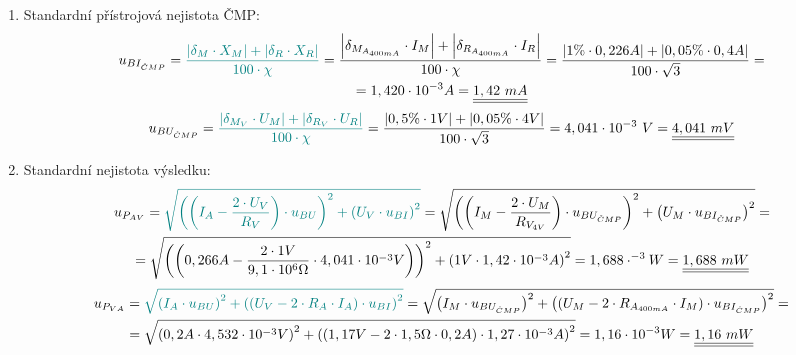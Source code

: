\documentclass[a4paper, czech]{article}
\begin{document}
\begin{enumerate}
    \item Standardní přístrojová nejistota ČMP:
    \begin{multline*}
        u_{BI_{\Check{C}MP}} = \textcolor{teal}{\frac{\left| \delta_M \cdot X_M \right| + \left| \delta_R \cdot X_R \right|}{100 \cdot \chi}} = \frac{\left| \delta_{M_{A_{400mA}}} \cdot I_M \right| + \left| \delta_{R_{A_{400mA}}} \cdot I_R \right|}{100 \cdot \chi} = \frac{\left| 1 \% \cdot 0,226 A \right| + \left| 0,05 \% \cdot 0,4 A \right|}{100 \cdot \sqrt{3}} = \\
        = 1,420 \cdot 10^{-3} A = \underline{\underline{1,42\ mA}}
    \end{multline*}
    \begin{multline*}
        u_{BU_{\Check{C}MP}} = \textcolor{teal}{\frac{\left| \delta_{M_{V}} \cdot U_M \right| + \left| \delta_{R_{V}} \cdot U_R \right|}{100 \cdot \chi}} = \frac{|0,5 \% \cdot 1 V|+|0,05 \% \cdot 4 V|}{100 \cdot \sqrt{3}} = 4,041 \cdot 10^{-3}\ V = \underline{\underline{4,041\ mV}} \hfill
    \end{multline*}

    \item Standardní nejistota výsledku:
    \begin{multline*}
        u_{P_{AV}} = \textcolor{teal}{\sqrt{\left( \left( I_A - \frac{2 \cdot U_V}{R_V} \right) \cdot u_{BU} \right)^2 + \left( U_V \cdot u_{BI} \right)^2}} = \sqrt{\left( \left( I_M - \frac{2 \cdot U_M}{R_{V_{4V}}} \right) \cdot u_{BU_{\Check{C}MP}} \right)^2 + \left( U_M \cdot u_{BI_{\Check{C}MP}} \right)^2} = \\
        = \sqrt{\left( \left( 0,266A - \frac{2 \cdot 1V}{9,1 \cdot 10^6 \Omega} \cdot 4,041 \cdot 10^{-3}V \right) \right)^2 + \left( 1V \cdot 1,42 \cdot 10^{-3}A \right)^2} = 1,688 \cdot^{-3}W = \underline{\underline{1,688\ mW}}
    \end{multline*}
    \begin{multline*}
        u_{P_{VA}} = \textcolor{teal}{\sqrt{\left( I_A \cdot u_{BU} \right)^2 + \left( \left( U_V - 2 \cdot R_A \cdot I_A \right) \cdot u_{BI} \right)^2}} = \sqrt{\left( I_M \cdot u_{BU_{\Check{C}MP}} \right)^2 + \left( \left( U_M - 2 \cdot R_{A_{400mA}} \cdot I_M \right) \cdot u_{BI_{\Check{C}MP}} \right)^2} =  \\
        = \sqrt{\left( 0,2A \cdot 4,532 \cdot 10^{-3}V \right)^2 + \left( \left( 1,17V - 2 \cdot 1,5 \Omega \cdot 0,2A \right) \cdot 1,27 \cdot 10^{-3}A \right)^2} = 1,16 \cdot 10^{-3} W = \underline{\underline{1,16\ mW}}
    \end{multline*}


\end{enumerate}
\end{document}
